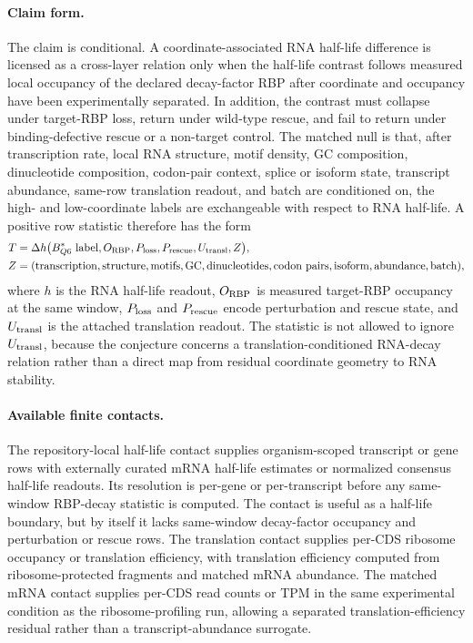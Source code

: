 \paragraph{Claim form.}
The claim is conditional.  A coordinate-associated RNA half-life difference is licensed as a cross-layer relation only when the half-life contrast follows measured local occupancy of the declared decay-factor RBP after coordinate and occupancy have been experimentally separated.  In addition, the contrast must collapse under target-RBP loss, return under wild-type rescue, and fail to return under binding-defective rescue or a non-target control.  The matched null is that, after transcription rate, local RNA structure, motif density, GC composition, dinucleotide composition, codon-pair context, splice or isoform state, transcript abundance, same-row translation readout, and batch are conditioned on, the high- and low-coordinate labels are exchangeable with respect to RNA half-life.  A positive row statistic therefore has the form
$$
\begin{aligned}
T &= \Delta h\bigl(B^{*}_{Q6}{\rm\ label}, O_{\rm RBP}, P_{\rm loss}, P_{\rm rescue}, U_{\rm transl}, Z\bigr),\\
Z &= ({\rm transcription}, {\rm structure}, {\rm motifs}, {\rm GC}, {\rm dinucleotides}, {\rm codon\ pairs}, {\rm isoform}, {\rm abundance}, {\rm batch}),
\end{aligned}
$$
where $h$ is the RNA half-life readout, $O_{\rm RBP}$ is measured target-RBP occupancy at the same window, $P_{\rm loss}$ and $P_{\rm rescue}$ encode perturbation and rescue state, and $U_{\rm transl}$ is the attached translation readout.  The statistic is not allowed to ignore $U_{\rm transl}$, because the conjecture concerns a translation-conditioned RNA-decay relation rather than a direct map from residual coordinate geometry to RNA stability.

\paragraph{Available finite contacts.}
The repository-local half-life contact supplies organism-scoped transcript or gene rows with externally curated mRNA half-life estimates or normalized consensus half-life readouts.  Its resolution is per-gene or per-transcript before any same-window RBP-decay statistic is computed.  The contact is useful as a half-life boundary, but by itself it lacks same-window decay-factor occupancy and perturbation or rescue rows.  The translation contact supplies per-CDS ribosome occupancy or translation efficiency, with translation efficiency computed from ribosome-protected fragments and matched mRNA abundance.  The matched mRNA contact supplies per-CDS read counts or TPM in the same experimental condition as the ribosome-profiling run, allowing a separated translation-efficiency residual rather than a transcript-abundance surrogate.

